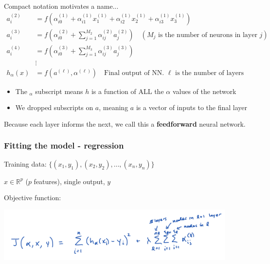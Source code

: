 \documentclass[mathserif, aspectratio=169]{beamer}
\begin{document}
\begin{frame}{Compact notation motivates a name...}
	\pause
	\begin{align*}
		a^{(2)}_i &= f(\alpha_{i0}^{(1)} + \alpha_{i1}^{(1)}x_1^{(1)}+\alpha_{i2}^{(1)}x_2^{(1)}+\alpha_{i3}^{(1)}x_3^{(1)})\\
		a^{(3)}_i & = f(\alpha_{i0}^{(2)} + \sum_{j=1}^{M_2} \alpha_{ij}^{(2)}a_j^{(2)}) \quad (M_j \text{ is the number of neurons in layer $j$})\\
		a^{(4)}_i & = f(\alpha_{i0}^{(3)} + \sum_{j=1}^{M_3} \alpha_{ij}^{(3)}a_j^{(3)})\\
		&\vdots\\
		h_\alpha(x) &= f(a^{(\ell)}, \alpha^{(\ell)}) \quad \text{Final output of NN. }\ell \text{ is the number of layers}
	\end{align*}

	\begin{itemize}
		\item The $_\alpha$ subscript means $h$ is a function of ALL the $\alpha$ values of the network
		\item We dropped subscripts on $a$, meaning $a$ is a vector of inputs to the final layer
	\end{itemize}
	Because each layer informs the next, we call this a \textbf{feedforward} neural network.
\end{frame}

\begin{frame}[t]\frametitle{Fitting the model - regression}
	Training data: $\{(x_1,y_1), (x_2,y_2), \hdots, (x_n,y_n)\}$

	\vspace{5mm}

	$x \in \mathbb{R}^p$ ($p$ features), single output, $y$

	\vspace{5mm}
	Objective function: 
	\pause

	\includegraphics[width = 0.9\textwidth]{NN_J}

\end{frame}
\end{document}
